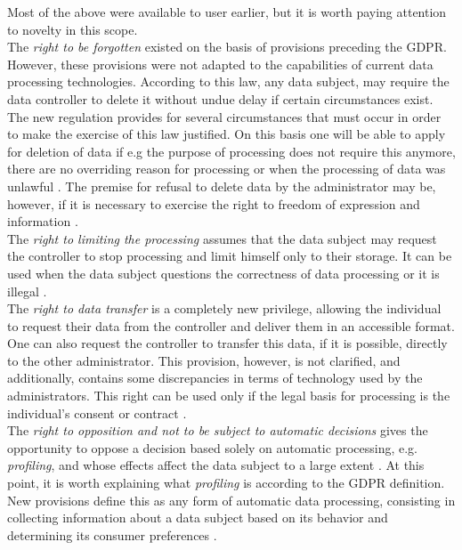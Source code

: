 \documentclass[en, noamssymb]{mgr}
\begin{document}
Most of the above were available to user earlier, but it is worth paying attention to novelty in this scope.\\
\indent The \textit{right to be forgotten} existed on the basis of provisions preceding the GDPR. However, these provisions were not adapted to the capabilities of current data processing technologies. According to this law, any data subject, may require the data controller to delete it without undue delay if certain circumstances exist. The new regulation provides for several circumstances that must occur in order to make the exercise of this law justified. On this basis one will be able to apply for deletion of data if e.g the purpose of processing does not require this anymore, there are no overriding reason for processing or when the processing of data was unlawful \cite{delloite_prawa_podmiotow}. The premise for refusal to delete data by the administrator may be, however, if it is necessary to exercise the right to freedom of expression and information \cite{delloite_prawa_podmiotow}.\\
\indent The \textit{right to limiting the processing} assumes that the data subject may request the controller to stop processing and limit himself only to their storage. It can be used when the data subject questions the correctness of data processing or it is illegal \cite{delloite_prawa_podmiotow}.\\
\indent The \textit{right to data transfer} is a completely new privilege, allowing the individual to request their data from the controller and deliver them in an accessible format. One can also request the controller to transfer this data, if it is possible, directly to the other administrator. This provision, however, is not clarified, and additionally, contains some discrepancies in terms of technology used by the administrators. This right can be used only if the legal basis for processing is the individual's consent or contract \cite{delloite_prawa_podmiotow}.\\
\indent The \textit{right to opposition and not to be subject to automatic decisions} gives the opportunity to oppose a decision based solely on automatic processing, e.g. \textit{profiling}, and whose effects affect the data subject to a large extent \cite{delloite_prawa_podmiotow}. At this point, it is worth explaining what \textit{profiling} is according to the GDPR definition. New provisions define this as any form of automatic data processing, consisting in collecting information about a data subject based on its behavior and determining its consumer preferences \cite{rodo_art4}.
\end{document}
